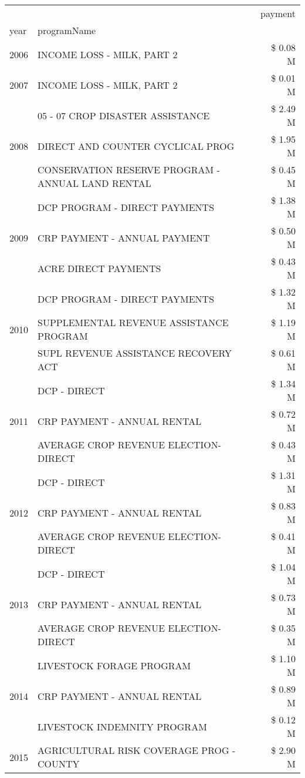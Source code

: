 \begin{tabular}{llr}
\toprule
 &  & payment \\
year & programName &  \\
\midrule
2006 & INCOME LOSS - MILK, PART 2 & \$ 0.08 M \\
\cline{1-3}
2007 & INCOME LOSS - MILK, PART 2 & \$ 0.01 M \\
\cline{1-3}
\multirow[t]{3}{*}{2008} & 05 - 07 CROP DISASTER ASSISTANCE & \$ 2.49 M \\
 & DIRECT AND COUNTER CYCLICAL PROG & \$ 1.95 M \\
 & CONSERVATION RESERVE PROGRAM - ANNUAL LAND RENTAL & \$ 0.45 M \\
\cline{1-3}
\multirow[t]{3}{*}{2009} & DCP PROGRAM - DIRECT PAYMENTS & \$ 1.38 M \\
 & CRP PAYMENT - ANNUAL PAYMENT & \$ 0.50 M \\
 & ACRE DIRECT PAYMENTS & \$ 0.43 M \\
\cline{1-3}
\multirow[t]{3}{*}{2010} & DCP PROGRAM - DIRECT PAYMENTS & \$ 1.32 M \\
 & SUPPLEMENTAL REVENUE ASSISTANCE PROGRAM & \$ 1.19 M \\
 & SUPL REVENUE ASSISTANCE RECOVERY ACT & \$ 0.61 M \\
\cline{1-3}
\multirow[t]{3}{*}{2011} & DCP - DIRECT & \$ 1.34 M \\
 & CRP PAYMENT - ANNUAL RENTAL & \$ 0.72 M \\
 & AVERAGE CROP REVENUE ELECTION-DIRECT & \$ 0.43 M \\
\cline{1-3}
\multirow[t]{3}{*}{2012} & DCP - DIRECT & \$ 1.31 M \\
 & CRP PAYMENT - ANNUAL RENTAL & \$ 0.83 M \\
 & AVERAGE CROP REVENUE ELECTION-DIRECT & \$ 0.41 M \\
\cline{1-3}
\multirow[t]{3}{*}{2013} & DCP - DIRECT & \$ 1.04 M \\
 & CRP PAYMENT - ANNUAL RENTAL & \$ 0.73 M \\
 & AVERAGE CROP REVENUE ELECTION-DIRECT & \$ 0.35 M \\
\cline{1-3}
\multirow[t]{3}{*}{2014} & LIVESTOCK FORAGE PROGRAM & \$ 1.10 M \\
 & CRP PAYMENT - ANNUAL RENTAL & \$ 0.89 M \\
 & LIVESTOCK INDEMNITY PROGRAM & \$ 0.12 M \\
\cline{1-3}
\multirow[t]{3}{*}{2015} & AGRICULTURAL RISK COVERAGE PROG - COUNTY & \$ 2.90 M \\

\end{tabular}
